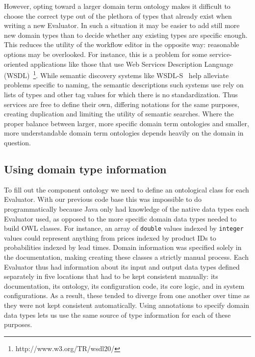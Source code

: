 \documentclass{article}
\begin{document}
However, opting toward a larger domain term ontology makes it difficult to choose the correct type out of the plethora of types that already exist when writing a new Evaluator.
In such a situation it may be easier to add still more new domain types than to decide whether any existing types are specific enough.
This reduces the utility of the workflow editor in the opposite way:  reasonable options may be overlooked.
For instance, this is a problem for some service-oriented applications like those that use Web Services Description Language (WSDL)~\footnote{http://www.w3.org/TR/wsdl20/}.
While semantic discovery systems like WSDL-S~\cite{rajasekaran2005enhancing} help alleviate problems specific to naming, the semantic descriptions such systems use rely on lists of types and other tag values for which there is no standardization.
Thus services are free to define their own, differing notations for the same purposes, creating duplication and limiting the utility of semantic searches.
Where the proper balance between larger, more specific domain term ontologies and smaller, more understandable domain term ontologies depends heavily on the domain in question.

\subsection{Using domain type information}

To fill out the component ontology we need to define an ontological class for each Evaluator.
With our previous code base this was impossible to do programmatically because Java only had knowledge of the native data types each Evaluator used, as opposed to the more specific domain data types needed to build OWL classes.
For instance, an array of \texttt{double} values indexed by \texttt{integer} values could represent anything from prices indexed by product IDs to probabilities indexed by lead times.
Domain information was specified solely in the documentation, making creating these classes a strictly manual process.
Each Evaluator thus had information about its input and output data types defined separately in five locations that had to be kept consistent manually:  its documentation, its ontology, its configuration code, its core logic, and in system configurations.
As a result, these tended to diverge from one another over time as they were not kept consistent automatically.
Using annotations to specify domain data types lets us use the same source of type information for each of these purposes.
\end{document}
